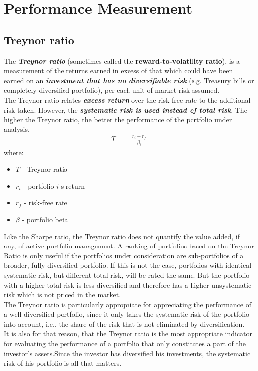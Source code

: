 \chapter{Performance Measurement}

\section{Treynor ratio}
The \textit{\textbf{\color{blue}Treynor ratio}} (sometimes called the \textbf{reward-to-volatility ratio}), is a measurement of the returns earned in excess of that which could have been earned on an  \textit{\textbf{\color{blue}investment that has no diversifiable risk}} (e.g. Treasury bills or completely diversified portfolio), per each unit of market risk assumed.\\
The Treynor ratio relates \textit{\textbf{\color{blue}excess return}} over the risk-free rate to the additional risk taken. However, the \textit{\textbf{\color{blue}systematic risk is used instead of total risk}}. The higher the Treynor ratio, the better the performance of the portfolio under analysis.
\begin{eqnarray}
	T &=& \frac{r_{i} - r_{f}}{\beta_{i}}
\end{eqnarray}
where:
\begin{itemize}
	\item $T$ - Treynor ratio
	\item $r_{i}$ - portfolio $i$-s return
	\item $r_{f}$ - risk-free rate
	\item $\beta$ - portfolio beta
\end{itemize}
Like the Sharpe ratio, the Treynor ratio does not quantify the value added, if any, of active portfolio management. A ranking of portfolios based on the Treynor Ratio is only useful if the portfolios under consideration are sub-portfolios of a broader, fully diversified portfolio. If this is not the case, portfolios with identical systematic risk, but different total risk, will be rated the same. But the portfolio with a higher total risk is less diversified and therefore has a higher unsystematic risk which is not priced in the market.\\
The Treynor ratio is particularly appropriate for appreciating the performance of a well diversified portfolio, since it only takes the systematic risk of the portfolio into account, i.e., the share of the risk that is not eliminated by diversification.\\
It is also for that reason, that the Treynor ratio is the most appropriate indicator for evaluating the performance of a portfolio that only constitutes a part of the investor's assets.Since the investor has diversified his investments, the systematic risk of his portfolio is all that matters.

